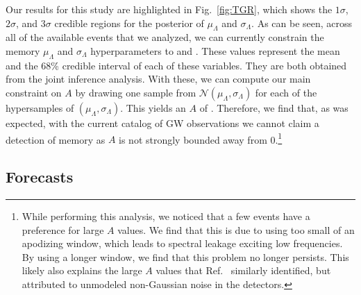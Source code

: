 \documentclass[aps,prd,reprint,twocolumn,10pt,eqsecnum,showpacs,nofootinbib,amsfonts,amssymb,amsmath,longbibliography,superscriptaddress,floatfix]{revtex4-1}
\begin{document}
Our results for this study are highlighted in Fig.~\ref{fig:TGR}, which shows the $1\sigma$, $2\sigma$, and $3\sigma$ credible regions for the posterior of $\mu_{\Lambda}$ and $\sigma_{\Lambda}$. As can be seen, across all of the available events that we analyzed, we can currently constrain the memory $\mu_{\Lambda}$ and $\sigma_{\Lambda}$ hyperparameters to \muLambdaconstraint and \sigmaLambdaconstraint. These values represent the mean and the 68\% credible interval of each of these variables. They are both obtained from the joint inference analysis. With these, we can compute our main constraint on $A$ by drawing one sample from $\mathcal{N}(\mu_{\Lambda},\sigma_{\Lambda})$ for each of the hypersamples of $(\mu_{\Lambda},\sigma_{\Lambda})$. This yields an $A$ of \Aconstraint. Therefore, we find that, as was expected, with the current catalog of GW observations we cannot claim a detection of memory as $A$ is not strongly bounded away from 0.\footnote{While performing this analysis, we noticed that a few events have a preference for large $A$ values. We find that this is due to using too small of an apodizing window, which leads to spectral leakage exciting low frequencies. By using a longer window, we find that this problem no longer persists. This likely also explains the large $A$ values that Ref.~\cite{Cheung:2024zow} similarly identified, but attributed to unmodeled non-Gaussian noise in the detectors.}

\subsection{Forecasts}
\label{sec:forecasts}
\end{document}
